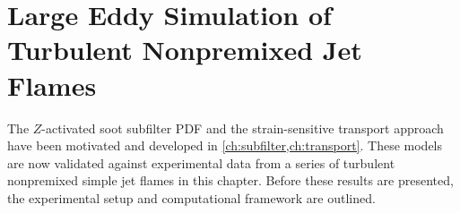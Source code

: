 \chapter{Large Eddy Simulation of Turbulent Nonpremixed Jet Flames\label{ch:lesresults}}


The $Z$-activated soot subfilter PDF and the strain-sensitive transport approach have been motivated and developed in \cref{ch:subfilter,ch:transport}. These models are now validated against experimental data from a series of turbulent nonpremixed simple jet flames in this chapter. Before these results are presented, the experimental setup and computational framework are outlined. 







